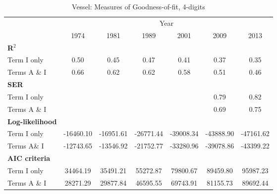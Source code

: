 \documentclass[a4paper,11pt]{article}
\begin{document}
\begin{table}[htbp]
  \centering
  \caption{Vessel: Measures of Goodness-of-fit, 4-digits}
\begin{center}
\label{tab:good_fit_ves_rob}%
\begin{tabular}{l|cccccc}
\hline
\hline
      & \multicolumn{6}{c}{Year}                   \\
      & \multicolumn{1}{c}{1974} & \multicolumn{1}{c}{1981} & \multicolumn{1}{c}{1989} & \multicolumn{1}{c}{2001} & \multicolumn{1}{c}{2009} & \multicolumn{1}{c}{2013}  \\ \hline
\boldmath{}\textbf{R$^{2}$}\unboldmath{} &       &       &       &       &       &         \\
Term I only & 0.50  & 0.45  & \multicolumn{1}{c}{0.47} & \multicolumn{1}{c}{0.41} & \multicolumn{1}{c}{0.37} & \multicolumn{1}{c}{0.35} \\
Terms A \& I & 0.66  & 0.62  & \multicolumn{1}{c}{0.62} & \multicolumn{1}{c}{0.58} & \multicolumn{1}{c}{0.51} & \multicolumn{1}{c}{0.46} \\
\textbf{SER} &       &       & \multicolumn{1}{c}{} & \multicolumn{1}{c}{} & \multicolumn{1}{c}{} & \multicolumn{1}{c}{} \\
Term I only &       &       & \multicolumn{1}{c}{} & \multicolumn{1}{c}{} & \multicolumn{1}{c}{0.79} & \multicolumn{1}{c}{0.82} \\
Terms A \& I &       &       & \multicolumn{1}{c}{} & \multicolumn{1}{c}{} & \multicolumn{1}{c}{0.69} & \multicolumn{1}{c}{0.75} \\
\textbf{Log-likelihood} &       &       & \multicolumn{1}{c}{} & \multicolumn{1}{c}{} & \multicolumn{1}{c}{} & \multicolumn{1}{c}{} \\
Term I only & -16460.10 & -16951.61 & \multicolumn{1}{c}{-26771.44} & \multicolumn{1}{c}{-39008.34} & \multicolumn{1}{c}{-43888.90} & \multicolumn{1}{c}{-47161.62} \\
Terms A\& I & -12743.65 & -13546.92 & \multicolumn{1}{c}{-21752.77} & \multicolumn{1}{c}{-33280.96} & \multicolumn{1}{c}{-39078.86} & \multicolumn{1}{c}{-43399.22}  \\
\textbf{AIC criteria} &       &       & \multicolumn{1}{c}{} & \multicolumn{1}{c}{} & \multicolumn{1}{c}{} & \multicolumn{1}{c}{} \\
Term I only & 34464.19 & 35491.21 & \multicolumn{1}{c}{55272.87} & \multicolumn{1}{c}{79800.67} & \multicolumn{1}{c}{89459.80} & \multicolumn{1}{c}{95987.23}\\
Terms A \& I & 28271.29 & 29877.84 & \multicolumn{1}{c}{46595.55} & \multicolumn{1}{c}{69743.91} & \multicolumn{1}{c}{81155.73} & \multicolumn{1}{c}{89692.44} \\

\end{tabular}
\end{center}
\end{table}
\end{document}
